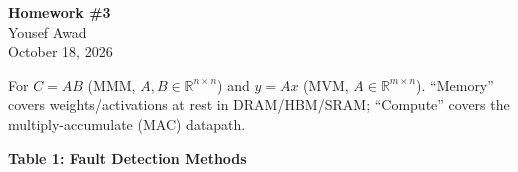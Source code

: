 \documentclass[10pt]{article}
\begin{document}
\begin{center}
	{\Large \textbf{Homework \#3}}\\[0.25em]
	{\normalsize Yousef Awad}\\[0.2em]
	{\small October 18, 2026}
\end{center}

\vspace{0.8em}

\vspace{0.4em}
\noindent For $C = AB$ (MMM, $A,B \in \mathbb{R}^{n\times n}$) and $y = Ax$ (MVM, $A \in \mathbb{R}^{m\times n}$). ``Memory'' covers weights/activations at rest in DRAM/HBM/SRAM; ``Compute'' covers the multiply-accumulate (MAC) datapath.

\vspace{0.6em}
\noindent\textbf{Table 1: Fault Detection Methods}
\vspace{0.25em}
\end{document}
